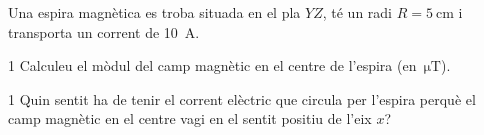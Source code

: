 Una espira magnètica es troba situada en el pla $YZ$, té un radi $R = 5\ \mathrm{cm}$ i transporta un corrent de 10~A.


\begin{apartat}{1}
Calculeu el mòdul del camp magnètic en el centre de l'espira (en~$\mathrm{\mu T}$).
\end{apartat}

\begin{apartat}{1}
Quin sentit ha de tenir el corrent elèctric que circula per l'espira perquè el camp magnètic en el centre vagi en el sentit positiu de l'eix $x$?
\end{apartat}

